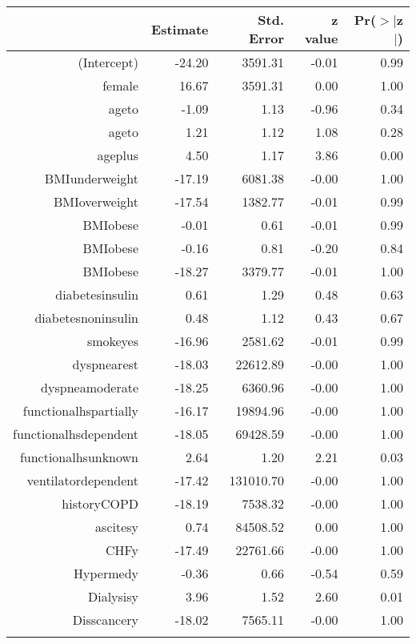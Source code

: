 \bigskip\bigskip
\centering
\begin{tabular}{rrrrr}
  \hline
 & Estimate & Std. Error & z value & Pr($>$$|$z$|$) \\ 
  \hline
(Intercept) & -24.20 & 3591.31 & -0.01 & 0.99 \\ 
  female & 16.67 & 3591.31 & 0.00 & 1.00 \\ 
  age\-65\-to\-74 & -1.09 & 1.13 & -0.96 & 0.34 \\ 
  age\-75\-to\-84 & 1.21 & 1.12 & 1.08 & 0.28 \\ 
  age\-85\-plus & 4.50 & 1.17 & 3.86 & 0.00 \\ 
  BMI\-underweight & -17.19 & 6081.38 & -0.00 & 1.00 \\ 
  BMI\-overweight & -17.54 & 1382.77 & -0.01 & 0.99 \\ 
  BMI\-obese\-1 & -0.01 & 0.61 & -0.01 & 0.99 \\ 
  BMI\-obese\-2 & -0.16 & 0.81 & -0.20 & 0.84 \\ 
  BMI\-obese\-3 & -18.27 & 3379.77 & -0.01 & 1.00 \\ 
  diabetes\-insulin & 0.61 & 1.29 & 0.48 & 0.63 \\ 
  diabetes\-noninsulin & 0.48 & 1.12 & 0.43 & 0.67 \\ 
  smoke\-yes & -16.96 & 2581.62 & -0.01 & 0.99 \\ 
  dyspnea\-rest & -18.03 & 22612.89 & -0.00 & 1.00 \\ 
  dyspnea\-moderate & -18.25 & 6360.96 & -0.00 & 1.00 \\ 
  functional\-hs\-partially & -16.17 & 19894.96 & -0.00 & 1.00 \\ 
  functional\-hs\-dependent & -18.05 & 69428.59 & -0.00 & 1.00 \\ 
  functional\-hs\-unknown & 2.64 & 1.20 & 2.21 & 0.03 \\ 
  ventilator\-dependent & -17.42 & 131010.70 & -0.00 & 1.00 \\ 
  history\-COPD & -18.19 & 7538.32 & -0.00 & 1.00 \\ 
  ascites\-y & 0.74 & 84508.52 & 0.00 & 1.00 \\ 
  CHF\-y & -17.49 & 22761.66 & -0.00 & 1.00 \\ 
  Hyper\-med\-y & -0.36 & 0.66 & -0.54 & 0.59 \\ 
  Dialysis\-y & 3.96 & 1.52 & 2.60 & 0.01 \\ 
  Diss\-cancer\-y & -18.02 & 7565.11 & -0.00 & 1.00 \\ 
$$
\end{tabular}
